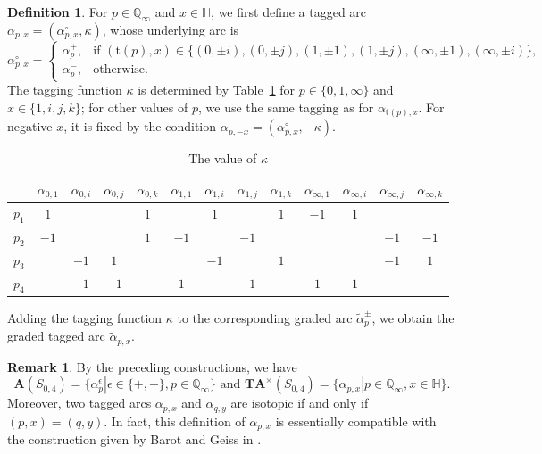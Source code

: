 \documentclass[11pt,a4paper,reqno]{amsart}%
\theoremstyle{plain}
\theoremstyle{definition}
\newtheorem{definition}[definition]{Definition}
\newtheorem{remark}[remark]{Remark}
\numberwithin{equation}{section}
\numberwithin{equation}{section}
\newcommand{\QQi}{\mathbb{Q}_\infty}
\newcommand{\typ}[1]{\mathrm{t}(#1)}%
\def\A{\mathbf{A}}
\def\TA{\mathbf{T}\mathbf{A}}
\newcommand{\bfH}{\mathbb{H}}
\begin{document}
\begin{definition} \label{def:tarc}
For $p\in\QQi$ and $x\in\bfH$, we first define a tagged arc $\alpha_{p,x}=(\alpha_{p,x}^\circ,\kappa)$, whose underlying arc is
\begin{equation*}
\alpha_{p,x}^\circ=
\begin{cases}
\alpha_p^{+},&\text{if }(\typ{p},x)\in\{(0,\pm i),(0,\pm j),(1,\pm 1), (1,\pm j),(\infty,\pm 1),(\infty,\pm i)\},\\
\alpha_p^{-},&\text{otherwise.} 
\end{cases}
\end{equation*}
The tagging function $\kappa$ is determined by Table~\ref{kappa} for $p\in\{0,1,\infty\}$ and $x\in\{1,i,j,k\}$; for other values of $p$, we use the same tagging as for $\alpha_{\typ{p},x}$. For negative $x$, it is fixed by the condition $\alpha_{p,-x}=(\alpha_{p,x}^\circ,-\kappa)$. 


\begin{table}[htbp]
\centering
\caption{The value of $\kappa$}
\label{kappa}
\renewcommand{\arraystretch}{1.3}
\setlength{\tabcolsep}{4.5pt}

\begin{tabular}{l *{12}{c}}
\toprule
& $\alpha_{0,1}$ & $\alpha_{0,i}$ & $\alpha_{0,j}$ & $\alpha_{0,k}$
& $\alpha_{1,1}$ & $\alpha_{1,i}$ & $\alpha_{1,j}$ & $\alpha_{1,k}$
& $\alpha_{\infty,1}$ & $\alpha_{\infty,i}$ & $\alpha_{\infty,j}$ & $\alpha_{\infty,k}$ \\
\midrule
$p_1$ & $1$ &   &   & $1$ &   & $1$ &   & $1$ & $-1$ & $1$ &   &   \\
$p_2$ & $-1$ &   &   & $1$ & $-1$ &   & $-1$ &   &   &   & $-1$ & $-1$ \\
$p_3$ &   & $-1$ & $1$ &   &   & $-1$ &   & $1$ &   &   & $-1$ & $1$ \\
$p_4$ &   & $-1$ & $-1$ &   & $1$ &   & $-1$ &   & $1$ & $1$ &   &   \\
\bottomrule
\end{tabular}
\end{table}
Adding the tagging function $\kappa$ to the corresponding graded arc
$\widetilde{\alpha}_p^\pm$, we obtain the graded tagged arc
$\widetilde{\alpha}_{p,x}$.
 \end{definition}
\begin{remark}
By the preceding constructions, we have
   $$\A(S_{0,4})=\{\alpha_p^\epsilon| \epsilon \in \{+, -\}, p \in \QQi \} \text{ and }\TA^\times(S_{0,4})=\{\alpha_{p,x}|p\in\QQi,x \in\bfH\}.$$
 Moreover, two tagged arcs $\alpha_{p,x}$ and $\alpha_{q,y}$ are
isotopic if and only if $(p,x)=(q,y)$. In fact, this definition of  $\alpha_{p,x}$
      is essentially compatible with the construction given by Barot and Geiss in  \cite[Section~5]{BG}. 
 \end{remark}
\end{document}
